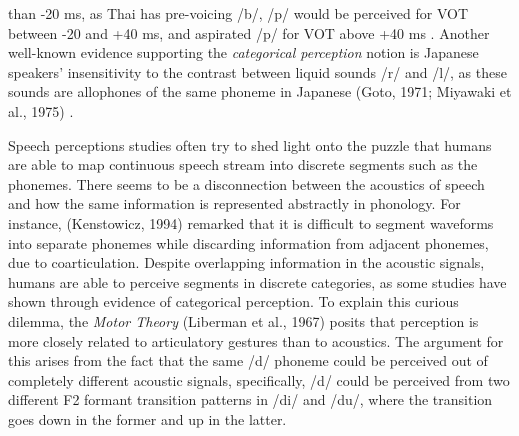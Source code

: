 \documentclass[a4paper]{article}
\begin{document}
than -20 ms, as Thai has pre-voicing /b/, /p/ would be perceived for VOT between -20 and +40 ms, and aspirated /p/ for VOT above +40 ms \cite{Abramson:1970aa} \cite{Abramson:1973aa}. Another well-known evidence supporting the \textit{categorical perception} notion is Japanese speakers' insensitivity to the contrast between liquid sounds /r/ and /l/, as these sounds are allophones of the same phoneme in Japanese (Goto, 1971; Miyawaki et al., 1975) \cite{Goto:1971aa}.

Speech perceptions studies often try to shed light onto the puzzle that humans are able to map continuous speech stream into discrete segments such as the phonemes. There seems to be a disconnection between the acoustics of speech and how the same information is represented abstractly in phonology. For instance, (Kenstowicz, 1994) remarked that it is difficult to segment waveforms into separate phonemes while discarding information from adjacent phonemes, due to coarticulation. Despite overlapping information in the acoustic signals, humans are able to perceive segments in discrete categories, as some studies have shown through evidence of categorical perception. To explain this curious dilemma, the \textit{Motor Theory} (Liberman et al., 1967) posits that perception is more closely related to articulatory gestures than to acoustics. The argument for this arises from the fact that the same /d/ phoneme could be perceived out of completely different acoustic signals, specifically, /d/ could be perceived from two different F2 formant transition patterns in /di/ and /du/, where the transition goes down in the former and up in the latter. 
\end{document}
